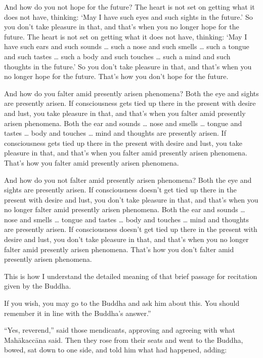 \documentclass[12pt,openany]{book}%
\begin{document}
And how do you not hope for the future? The heart is not set on getting what it does not have, thinking: ‘May I have such eyes and such sights in the future.’ So you don’t take pleasure in that, and that’s when you no longer hope for the future. The heart is not set on getting what it does not have, thinking: ‘May I have such ears and such sounds … such a nose and such smells … such a tongue and such tastes … such a body and such touches … such a mind and such thoughts in the future.’ So you don’t take pleasure in that, and that’s when you no longer hope for the future. That’s how you don’t hope for the future. 

And how do you falter amid presently arisen phenomena? Both the eye and sights are presently arisen. If consciousness gets tied up there in the present with desire and lust, you take pleasure in that, and that’s when you falter amid presently arisen phenomena. Both the ear and sounds … nose and smells … tongue and tastes … body and touches … mind and thoughts are presently arisen. If consciousness gets tied up there in the present with desire and lust, you take pleasure in that, and that’s when you falter amid presently arisen phenomena. That’s how you falter amid presently arisen phenomena. 

And how do you not falter amid presently arisen phenomena? Both the eye and sights are presently arisen. If consciousness doesn’t get tied up there in the present with desire and lust, you don’t take pleasure in that, and that’s when you no longer falter amid presently arisen phenomena. Both the ear and sounds … nose and smells … tongue and tastes … body and touches … mind and thoughts are presently arisen. If consciousness doesn’t get tied up there in the present with desire and lust, you don’t take pleasure in that, and that’s when you no longer falter amid presently arisen phenomena. That’s how you don’t falter amid presently arisen phenomena. 

This is how I understand the detailed meaning of that brief passage for recitation given by the Buddha. 

If you wish, you may go to the Buddha and ask him about this. You should remember it in line with the Buddha’s answer.” 

“Yes, reverend,” said those mendicants, approving and agreeing with what \textsanskrit{Mahākaccāna} said. Then they rose from their seats and went to the Buddha, bowed, sat down to one side, and told him what had happened, adding: 
\end{document}
